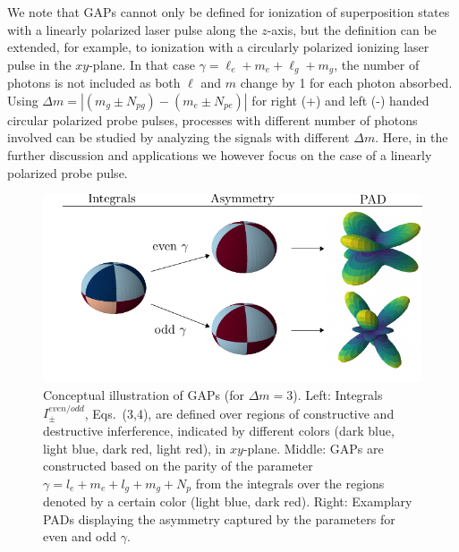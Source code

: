 We note that GAPs cannot only be defined for ionization of superposition states with a linearly polarized laser pulse along the $z$-axis, but the definition can be extended, for example, to ionization with a circularly polarized ionizing laser pulse in the $xy$-plane. In that case $\gamma=\ell_e + m_e + \ell_g + m_g$, the number of photons is not included as both $\ell$ and $m$ change by 1 for each photon absorbed. Using $\Delta m = |(m_g \pm N_{pg}) - (m_e \pm N_{pe})|$  for right (+) and left (-) handed circular polarized probe pulses, processes with different number of photons involved can be studied by analyzing the signals with different $\Delta m$. Here, in the further discussion and applications we however focus on the case of a linearly polarized probe pulse.

\begin{figure}[t]
\centering
\includegraphics[width=\linewidth]{figs/Photo_ionization/GAP/integral_combined.pdf}
\caption{
Conceptual illustration of GAPs (for $\Delta m=3$). Left: Integrals $I_\pm^{even/odd}$, Eqs.~(3,4), are defined over regions of constructive and destructive inferference, indicated by different colors (dark blue, light blue, dark red, light red), in $xy$-plane.
Middle: GAPs are constructed based on the parity of the parameter $\gamma = l_e+m_e+l_g+m_g+N_p$ from the integrals over the regions denoted by a certain color (light blue, dark red). 
Right: Examplary PADs displaying the asymmetry captured by the parameters for even and odd $\gamma$.
} 
  \label{fig:integrals}
\end{figure}

